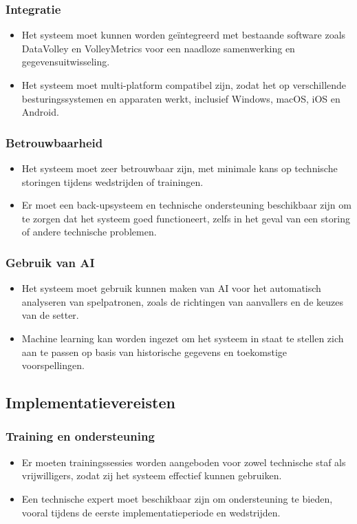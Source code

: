 \subsubsection{Integratie}
\begin{itemize}
  \item Het systeem moet kunnen worden geïntegreerd met bestaande software zoals DataVolley en VolleyMetrics voor een naadloze samenwerking en gegevensuitwisseling.
  \item Het systeem moet multi-platform compatibel zijn, zodat het op verschillende besturingssystemen en apparaten werkt, inclusief Windows, macOS, iOS en Android.
\end{itemize}

\subsubsection{Betrouwbaarheid}
\begin{itemize}
  \item Het systeem moet zeer betrouwbaar zijn, met minimale kans op technische storingen tijdens wedstrijden of trainingen.
  \item Er moet een back-upsysteem en technische ondersteuning beschikbaar zijn om te zorgen dat het systeem goed functioneert, zelfs in het geval van een storing of andere technische problemen.
\end{itemize}

\subsubsection{Gebruik van AI}
\begin{itemize}
  \item Het systeem moet gebruik kunnen maken van AI voor het automatisch analyseren van spelpatronen, zoals de richtingen van aanvallers en de keuzes van de setter.
  \item Machine learning kan worden ingezet om het systeem in staat te stellen zich aan te passen op basis van historische gegevens en toekomstige voorspellingen.
\end{itemize}

\subsection{Implementatievereisten}
\subsubsection{Training en ondersteuning}
\begin{itemize}
  \item Er moeten trainingssessies worden aangeboden voor zowel technische staf als vrijwilligers, zodat zij het systeem effectief kunnen gebruiken.
  \item Een technische expert moet beschikbaar zijn om ondersteuning te bieden, vooral tijdens de eerste implementatieperiode en wedstrijden.
\end{itemize}

